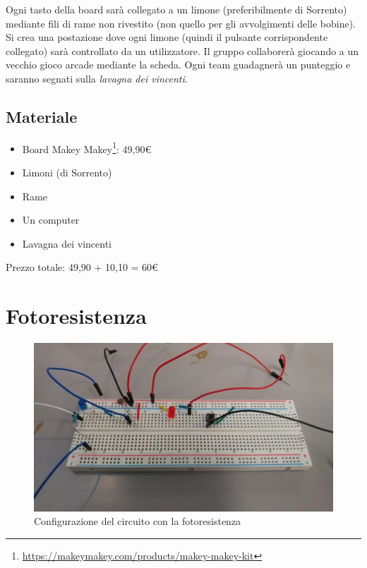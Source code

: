 \documentclass[a4paper]{article}
\begin{document}
Ogni tasto della board sarà collegato a un limone (preferibilmente di Sorrento)
mediante fili di rame non rivestito (non quello per gli avvolgimenti delle
bobine). Si crea una postazione dove ogni limone (quindi il pulsante
corrispondente collegato) sarà controllato da un utilizzatore. Il gruppo
collaborerà giocando a un vecchio gioco arcade mediante la scheda. Ogni team
guadagnerà un punteggio e saranno segnati sulla \emph{lavagna dei vincenti}.

\subsection{Materiale}%
\label{subsec:makeymakey-materiale}

\begin{itemize}
  \item Board Makey Makey\footnote{
        \url{https://makeymakey.com/products/makey-makey-kit} }: 49,90€
  \item Limoni (di Sorrento)
  \item Rame
  \item Un computer
  \item Lavagna dei vincenti
\end{itemize}

Prezzo totale: 49,90 + 10,10 = 60€

\section{Fotoresistenza}%
\label{sec:fotoresistenza}

\begin{figure}[ht]
  \centering
  \includegraphics[width=\linewidth]{figures/fotoresistenza}
  \caption{\label{fig:fotoresistenza} Configurazione del circuito con la fotoresistenza}
\end{figure}
\end{document}
